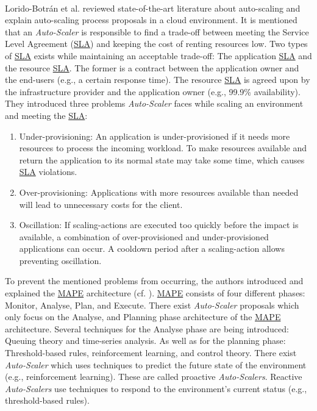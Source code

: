 \paragraph{}
Lorido-Botrán et al. \cite{Lorido2014Review} reviewed state-of-the-art literature about auto-scaling and explain auto-scaling process proposals in a cloud environment.
It is mentioned that an \textit{Auto-Scaler} is responsible to find a trade-off between meeting the Service Level Agreement (\hyperlink{abbr:sla}{SLA}) and keeping the cost of renting resources low.
Two types of \hyperlink{abbr:sla}{SLA} exists while maintaining an acceptable trade-off: The application \hyperlink{abbr:sla}{SLA} and the resource \hyperlink{abbr:sla}{SLA}. The former is a contract between the application owner and the end-users (e.g., a certain response time). The resource \hyperlink{abbr:sla}{SLA} is agreed upon by the infrastructure provider and the application owner (e.g., 99.9\% availability).
They introduced three problems \textit{Auto-Scaler} faces while scaling an environment and meeting the \hyperlink{abbr:sla}{SLA}:
\begin{enumerate}
\item Under-provisioning:
An application is under-provisioned if it needs more resources to process the incoming workload.
To make resources available and return the application to its normal state may take some time, which causes \hyperlink{abbr:sla}{SLA} violations.
\item Over-provisioning:
Applications with more resources available than needed will lead to unnecessary costs for the client.
\item Oscillation:
If scaling-actions are executed too quickly before the impact is available, a combination of over-provisioned and under-provisioned applications can occur.
A cooldown period after a scaling-action allows preventing oscillation.
\end{enumerate}
To prevent the mentioned problems from occurring, the authors introduced and explained the \hyperlink{abbr:mape}{MAPE} architecture (cf. ).
\hyperlink{abbr:mape}{MAPE} consists of four different phases: Monitor, Analyse, Plan, and Execute.
There exist \textit{Auto-Scaler} proposals which only focus on the Analyse, and Planning phase architecture of the \hyperlink{abbr:mape}{MAPE} architecture.
Several techniques for the Analyse phase are being introduced: Queuing theory and time-series analysis.
As well as for the planning phase: Threshold-based rules, reinforcement learning, and control theory.
There exist \textit{Auto-Scaler} which uses techniques to predict the future state of the environment (e.g., reinforcement learning). These are called proactive \textit{Auto-Scalers}.
Reactive \textit{Auto-Scalers} use techniques to respond to the environment's current status (e.g., threshold-based rules).



